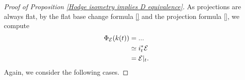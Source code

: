 \begin{proof}[Proof of Proposition \ref{Hodge isometry implies D equivalence}]
    
    As projections are always flat, by the flat base change formula \ref{} and the projection formula \ref{}, we compute
    \begin{align*}
        \Phi_{\mathcal E}(k(t)) &= ...\\
        & \simeq i_t^*\mathcal E \\
        & = \mathcal E|_t.
    \end{align*}
    Again, we consider the following cases. 


\end{proof}
